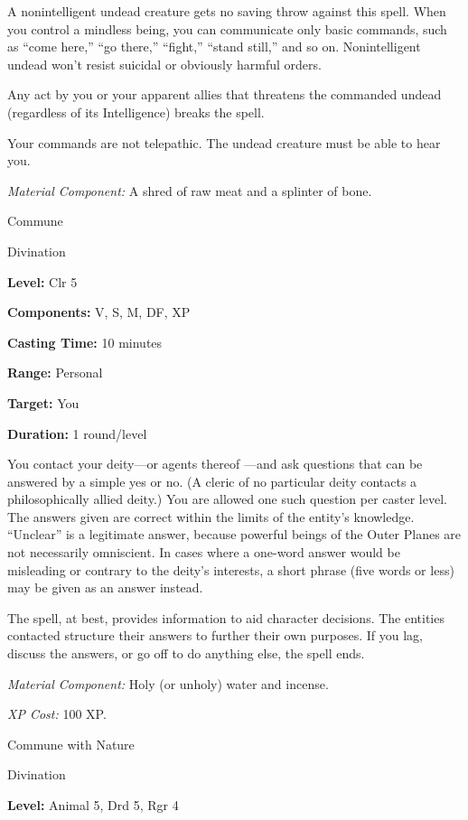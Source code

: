 \documentclass{article}
\begin{document}
A nonintelligent undead creature gets no saving throw against this spell. When 
you control a mindless being, you can communicate only basic commands, such as 
``come here,'' ``go there,'' ``fight,'' ``stand still,'' and so on. Nonintelligent 
undead won't resist suicidal or obviously harmful orders.

Any act by you or your apparent allies that threatens the commanded undead (regardless 
of its Intelligence) breaks the spell.

Your commands are not telepathic. The undead creature must be able to hear you.

\textit{Material Component: }A shred of raw meat and a splinter of bone.

\vspace{12pt}
Commune

Divination

\textbf{Level:} Clr 5

\textbf{Components:} V, S, M, DF, XP

\textbf{Casting Time:} 10 minutes

\textbf{Range:} Personal

\textbf{Target:} You

\textbf{Duration:} 1 round/level

You contact your deity---or agents thereof ---and ask questions that can be answered 
by a simple yes or no. (A cleric of no particular deity contacts a philosophically 
allied deity.) You are allowed one such question per caster level. The answers 
given are correct within the limits of the entity's knowledge. ``Unclear'' is a 
legitimate answer, because powerful beings of the Outer Planes are not necessarily 
omniscient. In cases where a one-word answer would be misleading or contrary to 
the deity's interests, a short phrase (five words or less) may be given as an answer 
instead.

The spell, at best, provides information to aid character decisions. The entities 
contacted structure their answers to further their own purposes. If you lag, discuss 
the answers, or go off to do anything else, the spell ends.

\textit{Material Component: }Holy (or unholy) water and incense.

\textit{XP Cost: }100 XP.

\vspace{12pt}
Commune with Nature

Divination

\textbf{Level:} Animal 5, Drd 5, Rgr 4
\end{document}
